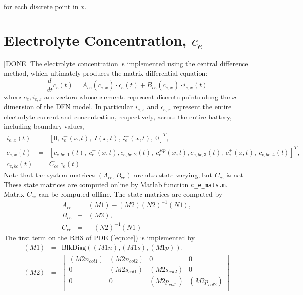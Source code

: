 \documentclass[12pt]{article}
\begin{document}
for each discrete point in $x$.

\section{Electrolyte Concentration, $c_{e}$}\label{sec:ce}
[DONE] The electrolyte concentration is implemented using the central difference method, which ultimately produces the matrix differential equation:
\begin{equation}
	\frac{d}{dt} c_{e}(t) = A_{ce}(c_{e,x}) \cdot c_{e}(t) + B_{ce}(c_{e,x}) \cdot i_{e,x}(t)
\end{equation}
where $c_{e}, i_{e,x}$ are vectors whose elements represent discrete points along the $x$-dimension of the DFN model. In particular $i_{e,x}$ and $c_{e,x}$ represent the entire electrolyte current and concentration, respectively, across the entire battery, including boundary values,
\begin{eqnarray}
	i_{e,x}(t) &=& \left[0, \ i_{e}^{-}(x,t), \ I(x,t), \ i_{e}^{+}(x,t), \ 0 \right]^{T}, \label{eqn:iex} \\
	c_{e,x}(t) &=& \left[c_{e,bc,1}(t), \ c_{e}^{-}(x,t), c_{e,bc,2}(t), \ c_{e}^{sep}(x,t), c_{e,bc,3}(t), \ c_{e}^{+}(x,t), \ c_{e,bc,4}(t) \right]^{T}, \label{eqn:cex} \\ 
	c_{e,bc}(t) &=& C_{ce} \ c_{e}(t) 
\end{eqnarray}
Note that the system matrices $(A_{ce}, B_{ce})$ are also state-varying, but $C_{ce}$ is not. These state matrices are computed online by Matlab function \texttt{c\_e\_mats.m}. Matrix $C_{ce}$ can be computed offline. The state matrices are computed by
\begin{eqnarray}
	A_{ce} &=& (M1) - (M2) (N2)^{-1} (N1), \\ 
	B_{ce} &=& (M3), \\
	C_{ce} &=& - (N2)^{-1} (N1)
\end{eqnarray}
The first term on the RHS of PDE (\ref{eqn:ce}) is implemented by
\begin{eqnarray}
	(M1) &=& \textrm{BlkDiag}\left( (M1n), (M1s), (M1p) \right), \\
	(M2) &=&
\left[
\begin{array}{cccc}
 (M2n_{col1}) & (M2n_{col2}) & 0 & 0 \\
 0 & (M2s_{col1}) & (M2s_{col2}) & 0 \\
 0 & 0 & (M2p_{col1}) & (M2p_{col2}) \\
\end{array}
\right]
\end{eqnarray}
\end{document}
